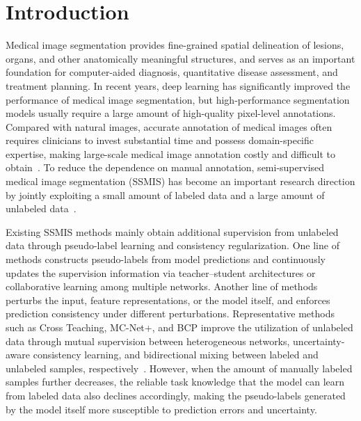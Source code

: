 \documentclass[a4paper,fleqn]{cas-dc}
\begin{document}



\section{Introduction}

Medical image segmentation provides fine-grained spatial delineation of lesions, organs, and other anatomically meaningful structures, and serves as an important foundation for computer-aided diagnosis, quantitative disease assessment, and treatment planning. In recent years, deep learning has significantly improved the performance of medical image segmentation, but high-performance segmentation models usually require a large amount of high-quality pixel-level annotations. Compared with natural images, accurate annotation of medical images often requires clinicians to invest substantial time and possess domain-specific expertise, making large-scale medical image annotation costly and difficult to obtain~\cite{hesamian2019deep,tajbakhsh2020embracing}. To reduce the dependence on manual annotation, semi-supervised medical image segmentation (SSMIS) has become an important research direction by jointly exploiting a small amount of labeled data and a large amount of unlabeled data~\cite{jiao2024learning}.

Existing SSMIS methods mainly obtain additional supervision from unlabeled data through pseudo-label learning and consistency regularization. One line of methods constructs pseudo-labels from model predictions and continuously updates the supervision information via teacher--student architectures or collaborative learning among multiple networks. Another line of methods perturbs the input, feature representations, or the model itself, and enforces prediction consistency under different perturbations. Representative methods such as Cross Teaching, MC-Net+, and BCP improve the utilization of unlabeled data through mutual supervision between heterogeneous networks, uncertainty-aware consistency learning, and bidirectional mixing between labeled and unlabeled samples, respectively~\cite{luo2022crossteaching,wu2022mcnet,bai2023bcp}. However, when the amount of manually labeled samples further decreases, the reliable task knowledge that the model can learn from labeled data also declines accordingly, making the pseudo-labels generated by the model itself more susceptible to prediction errors and uncertainty.
\end{document}
